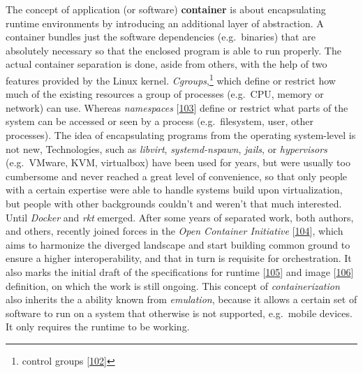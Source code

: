\documentclass[12pt,english,a4paper,titlepage,cleardoublepage=empty,dottedtoc]{report}
\begin{document}
The concept of application (or software)
\textbf{\protect\hypertarget{link-container}{}{container}} is about
encapsulating runtime environments by introducing an additional layer of
abstraction. A container bundles just the software dependencies
(e.g.~binaries) that are absolutely necessary so that the enclosed
program is able to run properly. The actual container separation is
done, aside from others, with the help of two features provided by the
Linux kernel. \emph{Cgroups},\footnote{control groups
  {[}\protect\hyperlink{ref-web_2015_cgroup-doc}{102}{]}} which define
or restrict how much of the existing resources a group of processes
(e.g.~CPU, memory or network) can use. Whereas \emph{namespaces}
{[}\protect\hyperlink{ref-web_2016_kernel-namespace}{103}{]} define or
restrict what parts of the system can be accessed or seen by a process
(e.g.~filesystem, user, other processes). The idea of encapsulating
programs from the operating system-level is not new, Technologies, such
as \emph{libvirt}, \emph{systemd-nspawn}, \emph{jails}, or
\emph{hypervisors} (e.g.~VMware, KVM, virtualbox) have been used for
years, but were usually too cumbersome and never reached a great level
of convenience, so that only people with a certain expertise were able
to handle systems build upon virtualization, but people with other
backgrounds couldn't and weren't that much interested. Until
\emph{Docker} and \emph{rkt} emerged. After some years of separated
work, both authors, and others, recently joined forces in the \emph{Open
Container Initiative}
{[}\protect\hyperlink{ref-web_2016_open-container-initiative}{104}{]},
which aims to harmonize the diverged landscape and start building common
ground to ensure a higher interoperability, and that in turn is
requisite for orchestration. It also marks the initial draft of the
specifications for runtime
{[}\protect\hyperlink{ref-web_oci-spec_runtime}{105}{]} and image
{[}\protect\hyperlink{ref-web_oci-spec_image}{106}{]} definition, on
which the work is still ongoing. This concept of \emph{containerization}
also inherits the a ability known from \emph{emulation}, because it
allows a certain set of software to run on a system that otherwise is
not supported, e.g.~mobile devices. It only requires the runtime to be
working.
\end{document}
